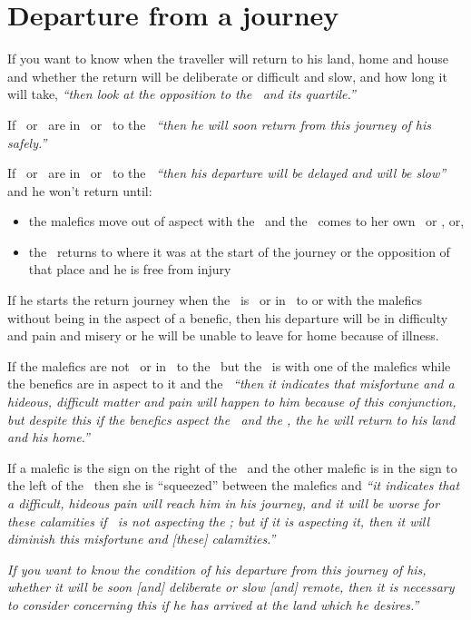 \section{Departure from a journey}
If you want to know when the traveller will return to his land, home and house and whether the return will be deliberate or difficult and slow, and how long it will take, \textsl{``then look at the opposition to the \Sun\, and its quartile.''}

If \Jupiter\, or \Venus\, are in \Square\ or \Opposition\, to the \Sun\, \textsl{``then he will soon return from this journey of his safely.''}

If \Saturn\, or \Mars\, are in \Square\, or \Opposition\, to the \Sun\, \textsl{``then his departure will be delayed and will be slow''} and he won't return until:
\begin{itemize}[topsep=0em,itemsep=0em]
\item the malefics move out of aspect with the \Moon\, and the \Moon\, comes to her own \Square\, or \Opposition, or,
\item the \Sun\, returns to where it was at the start of the journey or the opposition of that place and he is free from injury
\end{itemize}

If he starts the return journey when the \Moon\, is \Square\, or in \Opposition\, to or with the malefics without being in the aspect of a benefic, then his departure will be in difficulty and pain and misery or he will be unable to leave for home because of illness.

If the malefics are not \Square\, or in \Opposition\, to the \Moon\, but the \Moon\, is with one of the malefics while the benefics are in aspect to it and the \Sun\, \textsl{``then it indicates that misfortune and a hideous, difficult matter and pain will happen to him because of this conjunction, but despite this if the benefics aspect the \Sun\, and the \Moon, the he will return to his land and his home.''}

If a malefic is the sign on the right of the \Moon\, and the other malefic is in the sign to the left of the \Moon\, then she is ``squeezed'' between the malefics and \textsl{``it indicates that a difficult, hideous pain will reach him in his journey, and it will be worse for these calamities if \Jupiter\, is not aspecting the \Moon; but if it is aspecting it, then it will diminish this misfortune and [these] calamities.''}

\textsl{If you want to know the condition of his departure from this journey of his, whether it will be soon [and] deliberate or slow [and] remote, then it is necessary to consider concerning this if he has arrived at the land which he desires.''}

